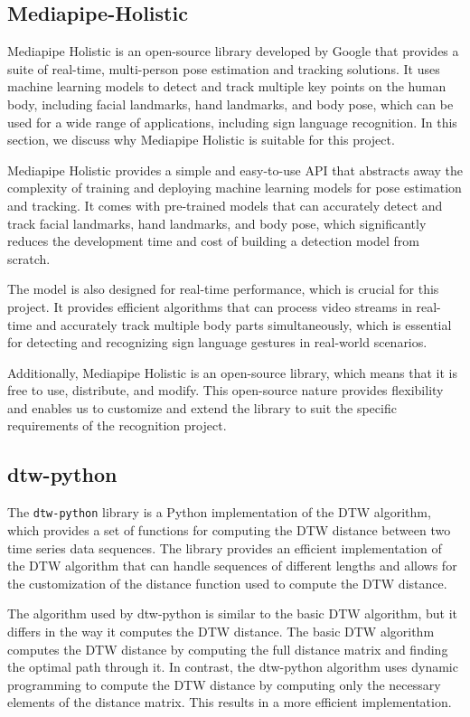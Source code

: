 \documentclass[final,rdr32.tex]{subfiles}
\begin{document}
\subsection{Mediapipe-Holistic}

Mediapipe Holistic is an open-source library developed by Google that provides a suite of real-time, multi-person pose estimation and tracking solutions. It uses machine learning models to detect and track multiple key points on the human body, including facial landmarks, hand landmarks, and body pose, which can be used for a wide range of applications, including sign language recognition. In this section, we discuss why Mediapipe Holistic is suitable for this project.

Mediapipe Holistic provides a simple and easy-to-use API that abstracts away the complexity of training and deploying machine learning models for pose estimation and tracking. It comes with pre-trained models that can accurately detect and track facial landmarks, hand landmarks, and body pose, which significantly reduces the development time and cost of building a detection model from scratch.

The model is also designed for real-time performance, which is crucial for this project. It provides efficient algorithms that can process video streams in real-time and accurately track multiple body parts simultaneously, which is essential for detecting and recognizing sign language gestures in real-world scenarios.

Additionally, Mediapipe Holistic is an open-source library, which means that it is free to use, distribute, and modify. This open-source nature provides flexibility and enables us to customize and extend the library to suit the specific requirements of the recognition project.

\subsection{dtw-python}

The \verb|dtw-python| library is a Python implementation of the DTW algorithm, which provides a set of functions for computing the DTW distance between two time series data sequences. The library provides an efficient implementation of the DTW algorithm that can handle sequences of different lengths and allows for the customization of the distance function used to compute the DTW distance.

The algorithm used by dtw-python is similar to the basic DTW algorithm, but it differs in the way it computes the DTW distance. The basic DTW algorithm computes the DTW distance by computing the full distance matrix and finding the optimal path through it. In contrast, the dtw-python algorithm uses dynamic programming to compute the DTW distance by computing only the necessary elements of the distance matrix. This results in a more efficient implementation.
\end{document}
